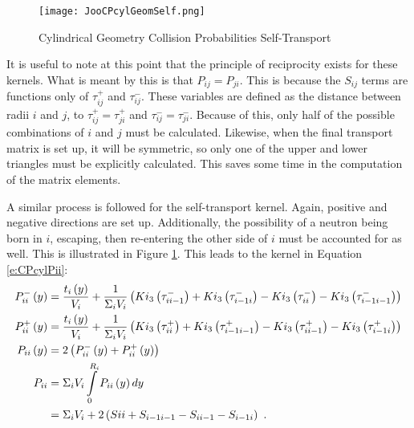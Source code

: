 \begin{figure}[h]
  \centering
  \texttt{[image: JooCPcylGeomSelf.png]}
  \caption[Cylindrical Geometry Collision Probabilities Self-Transport]{Cylindrical Geometry Collision Probabilities Self-Transport \cite{NERS561CPNotes}}\label{f:CPcylGeomSelf}
\end{figure}

It is useful to note at this point that the principle of reciprocity exists for these kernels.  What is meant by this is that $P_{ij} = P_{ji}$.  This is because the $S_{ij}$ terms are functions only of $\tau_{ij}^+$ and $\tau_{ij}^-$.  These variables are defined as the distance between radii $i$ and $j$, to $\tau_{ij}^+ = \tau_{ji}^+$ and $\tau_{ij}^- = \tau_{ji}^-$.  Because of this, only half of the possible combinations of $i$ and $j$ must be calculated.  Likewise, when the final transport matrix is set up, it will be symmetric, so only one of the upper and lower triangles must be explicitly calculated.  This saves some time in the computation of the matrix elements.

A similar process is followed for the self-transport kernel.  Again, positive and negative directions are set up.  Additionally, the possibility of a neutron being born in $i$, escaping, then re-entering the other side of $i$ must be accounted for as well.  This is illustrated in Figure \ref{f:CPcylGeomSelf}.  This leads to the kernel in Equation \ref{e:CPcylPii}:
\begin{subequations}\label{e:CPcylPii}
  \begin{align}
  P_{ii}^-\left(y\right) &= \frac{t_i\left(y\right)}{V_i} + \frac{1}{\Sigma_i V_i}\left(Ki_3\left(\tau_{ii-1}^-\right) + Ki_3\left(\tau_{i-1i}^-\right) - Ki_3\left(\tau_{ii}^-\right) - Ki_3\left(\tau_{i-1i-1}^-\right)\right) \\
  P_{ii}^+\left(y\right) &= \frac{t_i\left(y\right)}{V_i} + \frac{1}{\Sigma_i V_i}\left(Ki_3\left(\tau_{ii}^+\right) + Ki_3\left(\tau_{i-1i-1}^+\right) - Ki_3\left(\tau_{ii-1}^+\right) - Ki_3\left(\tau_{i-1i}^+\right)\right) \\
  P_{ii}\left(y\right) &= 2 \left(P_{ii}^-\left(y\right) + P_{ii}^+\left(y\right)\right) \\
  P_{ii} &= \Sigma_i V_i \intop_0^{R_i} P_{ii}\left(y\right) dy \nonumber \\
  &= \Sigma_i V_i  + 2\left(S{ii} + S_{i-1i-1} - S_{ii-1} - S_{i-1i}\right)\ .
  \end{align}
\end{subequations}

